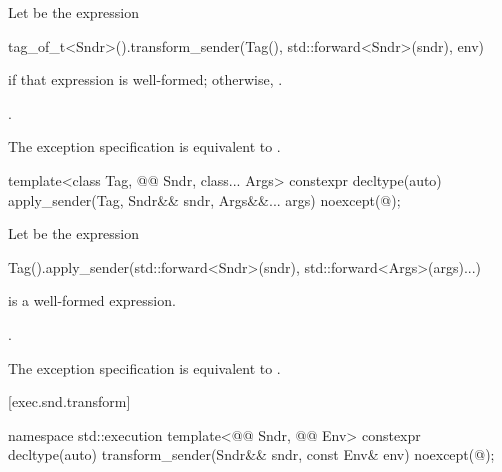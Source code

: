 \begin{itemdescr}
\pnum
Let  be the expression
\begin{codeblock}
tag_of_t<Sndr>().transform_sender(Tag(), std::forward<Sndr>(sndr), env)
\end{codeblock}
if that expression is well-formed;
otherwise, .

\pnum
\returns
{}.

\pnum
\remarks
The exception specification is equivalent to .
\end{itemdescr}

%
\begin{itemdecl}
template<class Tag, @@ Sndr, class... Args>
constexpr decltype(auto) apply_sender(Tag, Sndr&& sndr, Args&&... args)
  noexcept(@\seebelow@);
\end{itemdecl}

\begin{itemdescr}
\pnum
Let  be the expression
\begin{codeblock}
  Tag().apply_sender(std::forward<Sndr>(sndr), std::forward<Args>(args)...)
\end{codeblock}

\pnum
\constraints
{} is a well-formed expression.

\pnum
\returns
{}.

\pnum
\remarks
The exception specification is equivalent to .
\end{itemdescr}

[exec.snd.transform]{}

%
\begin{itemdecl}
namespace std::execution {
  template<@@ Sndr, @@ Env>
    constexpr decltype(auto) transform_sender(Sndr&& sndr, const Env& env)
      noexcept(@\seebelow@);
}
\end{itemdecl}

